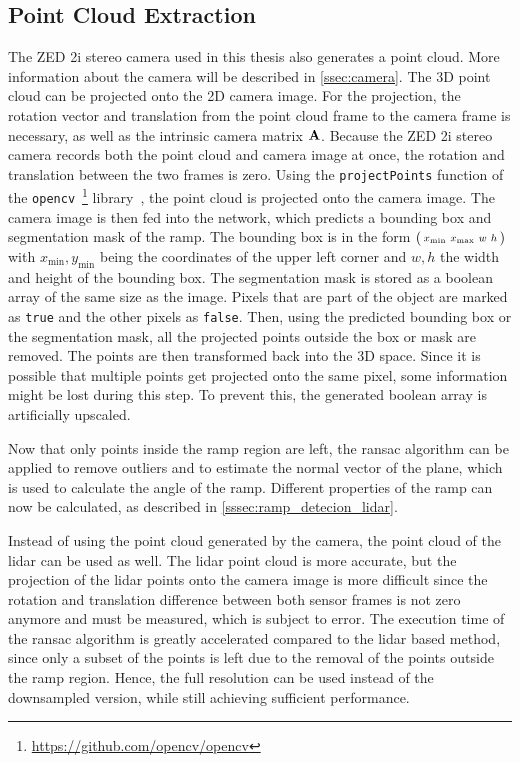 \subsection{Point Cloud Extraction}
\label{ssec:point_cloud_extraction}
The ZED 2i stereo camera used in this thesis also generates a point cloud.
More information about the camera will be described in \cref{ssec:camera}.
The 3D point cloud can be projected onto the 2D camera image.
For the projection, the rotation vector and translation from the point cloud frame to the camera frame is necessary, as well as the intrinsic camera matrix $\vb{A}$.
Because the ZED 2i stereo camera records both the point cloud and camera image at once, the rotation and translation between the two frames is zero.
Using the \texttt{projectPoints} function of the \texttt{opencv}~\footnote{\url{https://github.com/opencv/opencv}} library~\cite{Bradski2000}, the point cloud is projected onto the camera image.
The camera image is then fed into the network, which predicts a bounding box and segmentation mask of the ramp.
The bounding box is in the form  $\smqty(x_\mathrm{min} & x_\mathrm{max} & w & h)$ with $x_\mathrm{min}, y_\mathrm{min} $ being the coordinates of the upper left corner and $w, h$ the width and height of the bounding box.
The segmentation mask is stored as a boolean array of the same size as the image.
Pixels that are part of the object are marked as \texttt{true} and the other pixels as \texttt{false}.
Then, using the predicted bounding box or the segmentation mask, all the projected points outside the box or mask are removed.
The points are then transformed back into the 3D space.
Since it is possible that multiple points get projected onto the same pixel, some information might be lost during this step.
To prevent this, the generated boolean array is artificially upscaled.

Now that only points inside the ramp region are left, the \gls{ransac} algorithm can be applied to remove outliers and to estimate the normal vector of the plane, which is used to calculate the angle of the ramp.
Different properties of the ramp can now be calculated, as described in \cref{sssec:ramp_detecion_lidar}.

Instead of using the point cloud generated by the camera, the point cloud of the \gls{lidar} can be used as well.
The \gls{lidar} point cloud is more accurate, but the projection of the \gls{lidar} points onto the camera image is more difficult since the rotation and translation difference between both sensor frames is not zero anymore and must be measured, which is subject to error.
The execution time of the \gls{ransac} algorithm is greatly accelerated compared to the \gls{lidar} based method, since only a subset of the points is left due to the removal of the points outside the ramp region.
Hence, the full resolution can be used instead of the downsampled version, while still achieving sufficient performance.



